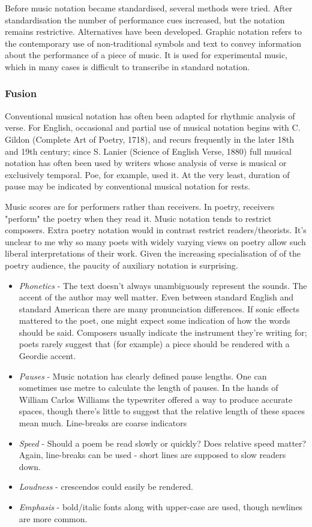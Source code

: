 \documentclass[11pt]{article}
\begin{document}
Before music notation became standardised, several methods were tried. After standardisation the number of performance cues increased, but the notation remains restrictive. Alternatives have been developed. Graphic notation refers to the contemporary use of non-traditional symbols and text to convey information about the performance of a piece of music. It is used for experimental music, which in many cases is difficult to transcribe in standard notation.

\subsubsection*{Fusion}


Conventional musical notation has often been adapted for rhythmic analysis of verse. For English, occasional and partial use of musical notation begins with C. Gildon (Complete Art of Poetry, 1718), and recurs frequently in the later 18th and 19th century; since S. Lanier (Science of English Verse, 1880) full musical notation has often been used by writers whose analysis of verse is musical or exclusively temporal. Poe, for example, used it. At the very least, duration of pause may be indicated by conventional musical notation for rests.


Music scores are for performers rather than receivers. In poetry, receivers "perform" the poetry when they read it.
Music notation tends to restrict composers. Extra poetry notation would in
contrast restrict readers/theorists. It's unclear to me why so many poets
with widely varying views on poetry allow such liberal interpretations of
their work.
Given the increasing specialisation of of the poetry audience, the paucity of auxiliary notation is surprising.
\begin{itemize}
\item  \textit{Phonetics} - The text doesn't always unambiguously represent the sounds. The accent of the author may well matter. Even between standard English
and standard American there are many pronunciation differences. If sonic
effects mattered to the poet, one might expect some indication of how
the words should be said. Composers usually indicate the instrument
they're writing for; poets rarely suggest that (for example) a piece should
be rendered with a Geordie accent.
\item  \textit{Pauses} - Music notation has clearly defined pause lengths. One can
sometimes use metre to calculate the length of pauses.  In the hands of William Carlos Williams the typewriter offered a way to produce accurate spaces, though
there's little to suggest that the relative length of these spaces mean much. 
Line-breaks are coarse indicators
\item  \textit{Speed} - Should a poem be read slowly or quickly? Does relative speed
matter? Again, line-breaks can be used - short lines are supposed to slow readers down.
\item  \textit{Loudness} - crescendos could easily be rendered.
\item  \textit{Emphasis}  - bold/italic fonts along with upper-case are used, though
newlines are more common.
\end{itemize}
\end{document}
